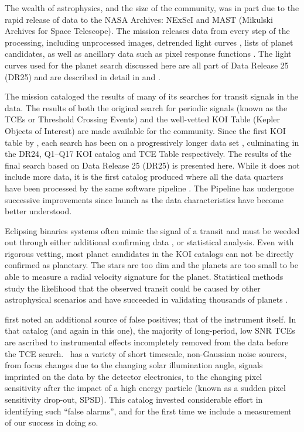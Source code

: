 The wealth of astrophysics, and the size of the \Kepler{} community, was in part due to the rapid release of \Kepler{} data to the NASA Archives: NExScI \citep[NASA Exoplanet Science Institute][]{Akeson2017} and MAST (Mikulski Archives for Space Telescope). The \Kepler{} mission releases data from every step of the processing, including unprocessed images, detrended light curves \citep{Stumpe2014}, lists of planet candidates, as well as ancillary data such as pixel response functions \citep{Bryson2010b}. The light curves used for the planet search discussed here are all part of Data Release 25 (DR25) and are described in detail in \citet{DRN25} and \citet{KDCH}.

The mission cataloged the results of many of its searches for transit signals in the data. The results of both the original search for periodic signals (known as the TCEs or Threshold Crossing Events) and the well-vetted KOI Table (Kepler Objects of Interest) are made available for the community.  Since the first KOI table by \citet{Borucki2011a}, each search has been on a progressively longer data set \citep{Batalha2013, Burke2014, Rowe2015b, Mullally2015cat}, culminating in the DR24, Q1--Q17 KOI catalog \citet{Coughlin2016} and TCE Table \citep{Seader2015} respectively.  The results of the final search based on Data Release 25 (DR25) is presented here. While it does not include more data, it is the first catalog produced where all the data quarters have been processed by the same software pipeline \citep[version 9.3,][]{JenkinsKDPH}. The \Kepler{} Pipeline has undergone successive improvements since launch as the data characteristics have become better understood.

Eclipsing binaries systems often mimic the signal of a transit and must be weeded out through either additional confirming data \citep[such as radial velocities, e.g.][]{Marcy2014}, or statistical analysis. Even with rigorous vetting, most planet candidates in the KOI catalogs can not be directly confirmed as planetary. The stars are too dim and the planets are too small to be able to measure a radial velocity signature for the planet.   Statistical methods study the likelihood that the observed transit could be caused by other astrophysical scenarios and have succeeded in validating thousands of \Kepler{} planets \citep[e.g.][]{Morton2016, Torres2015,Lissauer2014, Rowe2014}.  

\citet{Mullally2015cat} first noted an additional source of false positives; that of the instrument itself. In that catalog (and again in this one), the majority of long-period, low SNR TCEs are ascribed to instrumental effects incompletely removed from the data before the TCE search. \Kepler\ has a variety of short timescale, non-Gaussian noise sources, from focus changes due to the changing solar illumination angle, signals imprinted on the data by the detector electronics, to the changing pixel sensitivity after the impact of a high energy particle (known as a sudden pixel sensitivity drop-out, SPSD). This catalog invested considerable effort in identifying such ``false alarms'', and for the first time we include a measurement of our success in doing so.

